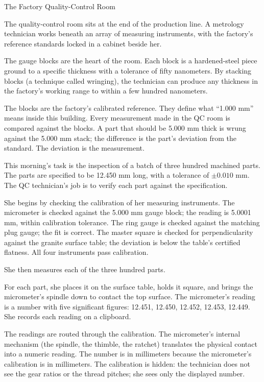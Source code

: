 \begin{coda}{The Factory Quality-Control Room}

The quality-control room sits at the end of the production line.
A metrology technician works beneath an array of measuring
instruments, with the factory's reference standards locked in a
cabinet beside her.

The gauge blocks are the heart of the room. Each block is a
hardened-steel piece ground to a specific thickness with a tolerance
of fifty nanometers. By stacking blocks (a technique called
wringing), the technician can produce any thickness in the
factory's working range to within a few hundred nanometers.

The blocks are the factory's calibrated reference. They define what
``1.000 mm'' means inside this building. Every measurement made in
the QC room is compared against the blocks. A part that should be
5.000 mm thick is wrung against the 5.000 mm stack; the difference
is the part's deviation from the standard. The deviation is the
measurement.

This morning's task is the inspection of a batch of three hundred
machined parts. The parts are specified to be 12.450 mm long, with a
tolerance of $\pm 0.010$ mm. The QC technician's job is to verify each
part against the specification.

She begins by checking the calibration of her measuring instruments.
The micrometer is checked against the 5.000 mm gauge block; the reading
is 5.0001 mm, within calibration tolerance. The ring gauge is checked
against the matching plug gauge; the fit is correct. The master square
is checked for perpendicularity against the granite surface table; the
deviation is below the table's certified flatness. All four instruments
pass calibration.

She then measures each of the three hundred parts.

For each part, she places it on the surface table, holds it square, and
brings the micrometer's spindle down to contact the top surface. The
micrometer's reading is a number with five significant figures: 12.451,
12.450, 12.452, 12.453, 12.449. She records each reading on a
clipboard.

The readings are routed through the calibration. The micrometer's
internal mechanism (the spindle, the thimble, the ratchet) translates
the physical contact into a numeric reading. The number is in
millimeters because the micrometer's calibration is in millimeters. The
calibration is hidden: the technician does not see the gear ratios or
the thread pitches; she sees only the displayed number.


\end{coda}
